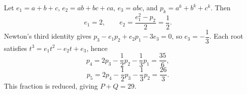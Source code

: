 Let $e_1=a+b+c$, $e_2=ab+bc+ca$, $e_3=abc$, and $p_k=a^k+b^k+c^k$. Then
\[
e_1=2,\qquad e_2=\dfrac{e_1^2-p_2}{2}=\dfrac{1}{2}.
\]
Newton's third identity gives $p_3-e_1p_2+e_2p_1-3e_3=0$, so $e_3=-\dfrac{1}{3}$. Each root satisfies $t^3=e_1t^2-e_2t+e_3$, hence
\[
p_4=2p_3-\dfrac{1}{2}p_2-\dfrac{1}{3}p_1=\dfrac{35}{6},
\]
\[
p_5=2p_4-\dfrac{1}{2}p_3-\dfrac{1}{3}p_2=\dfrac{26}{3}.
\]
This fraction is reduced, giving $\boxed{P+Q=29}$.
